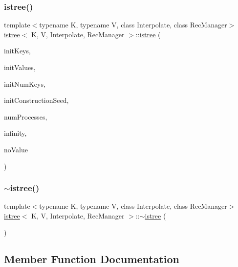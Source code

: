 \mbox{\label{classistree_a855f1a8a6458f6db1153b1188cd6f4be}} 
\subsubsection{\texorpdfstring{istree()}{istree()}\hspace{0.1cm}{\footnotesize\ttfamily [2/2]}}
{\footnotesize\ttfamily template$<$typename K, typename V, class Interpolate, class Rec\+Manager$>$ \\
\hyperlink{classistree}{istree}$<$ K, V, Interpolate, Rec\+Manager $>$\+::\hyperlink{classistree}{istree} (\begin{DoxyParamCaption}\item[{const K $\ast$const}]{init\+Keys,  }\item[{const V $\ast$const}]{init\+Values,  }\item[{const size\+\_\+t}]{init\+Num\+Keys,  }\item[{const size\+\_\+t}]{init\+Construction\+Seed,  }\item[{const int}]{num\+Processes,  }\item[{const K}]{infinity,  }\item[{const V}]{no\+Value }\end{DoxyParamCaption})\hspace{0.3cm}{\ttfamily [inline]}}

\mbox{\label{classistree_a2bc6843d8584242a5cb5de0eaa30310c}} 
\subsubsection{\texorpdfstring{$\sim$istree()}{~istree()}}
{\footnotesize\ttfamily template$<$typename K, typename V, class Interpolate, class Rec\+Manager$>$ \\
\hyperlink{classistree}{istree}$<$ K, V, Interpolate, Rec\+Manager $>$\+::$\sim$\hyperlink{classistree}{istree} (\begin{DoxyParamCaption}{ }\end{DoxyParamCaption})\hspace{0.3cm}{\ttfamily [inline]}}



\subsection{Member Function Documentation}
\mbox{\label{classistree_a5b335867433d58dd82595a39771c79fa}} 
